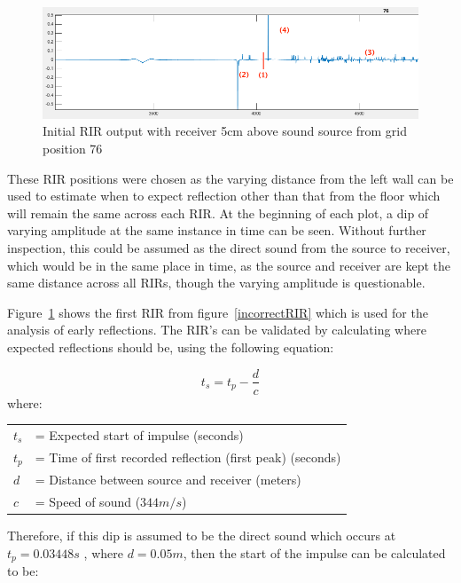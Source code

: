 \documentclass[../../main.tex]{subfiles}
\begin{document}
			\begin{figure}[H]
				\centerline{\includegraphics[scale = 0.5]{Sections/Implementation/Odeon/images/incorrectRIR/RIR_76_incorrect_edit_crop.png}}
				\caption{Initial \ac{RIR} output with receiver 5cm above sound source from grid position 76}
				\label{incorrectRIR_76}
			\end{figure}

			These \ac{RIR} positions were chosen as the varying distance from the left wall can be used to estimate when to expect reflection other than that from the floor which will remain the same across each \ac{RIR}. At the beginning of each plot, a dip of varying amplitude at the same instance in time can be seen. Without further inspection, this could be assumed as the direct sound from the source to receiver, which would be in the same place in time, as the source and receiver are kept the same distance across all RIRs, though the varying amplitude is questionable.

			Figure~\ref{incorrectRIR_76} shows the first \ac{RIR} from figure~\ref{incorrectRIR} which is used for the analysis of early reflections. The \ac{RIR}'s can be validated by calculating where expected reflections should be, using the following equation:
			
			\begin{equation}\label{distance}
				t_s = t_p - \frac{d}{c}
			\end{equation}
			where:

			\begin{tabular}{l l}
			$t_s$ & = Expected start of impulse (seconds)\\
			$t_p$ & = Time of first recorded reflection (first peak) (seconds)\\
			$d$ & = Distance between source and receiver (meters)\\
			$c$ & = Speed of sound ($344m/s$) \\
			\end{tabular}


			Therefore, if this dip is assumed to be the direct sound which occurs at $t_p = 0.03448s$ , where $d = 0.05m$, then the start of the impulse can be calculated to be:
\end{document}
